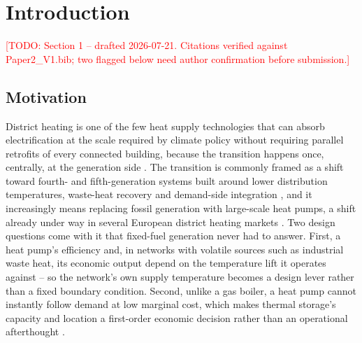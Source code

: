 \documentclass[review,3p]{elsarticle}
\newcommand{\todo}[1]{\textcolor{red}{[TODO: #1]}}
\begin{document}
\linenumbers

\section{Introduction}
\label{sec:intro}
\todo{Section 1 -- drafted 2026-07-21. Citations verified against
Paper2\_V1.bib; two flagged below need author confirmation before
submission.}

\subsection{Motivation}
\label{sec:intro:motivation}

District heating is one of the few heat supply technologies that can
absorb electrification at the scale required by climate policy without
requiring parallel retrofits of every connected building, because the
transition happens once, centrally, at the generation side
\cite{Lund.2014,Werner.2017}. The transition is commonly framed as a
shift toward fourth- and fifth-generation systems built around lower
distribution temperatures, waste-heat recovery and demand-side
integration \cite{Lund.2018,Lund.2021,Buffa.2019,Gjoka.2023}, and it
increasingly means replacing fossil generation with large-scale heat
pumps, a shift already under way in several European district heating
markets \cite{Averfalk.2017}. Two
design questions come with it that fixed-fuel generation never had to
answer. First, a heat pump's efficiency and, in networks with volatile
sources such as industrial waste heat, its economic output depend on the
temperature lift it operates against -- so the network's own supply
temperature becomes a design lever rather than a fixed boundary
condition. Second, unlike a gas boiler, a heat pump cannot instantly
follow demand at low marginal cost, which makes thermal storage's
capacity and location a first-order economic decision rather than an
operational afterthought \cite{Christensen.2024}.
\end{document}
